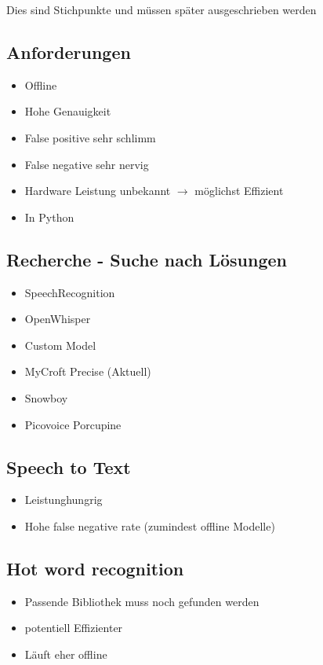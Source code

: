 \documentclass[../main.tex]{subfiles}
\begin{document}
Dies sind Stichpunkte und müssen später ausgeschrieben werden

\subsection{Anforderungen}

\begin{itemize}
    \item Offline
    \item Hohe Genauigkeit
    \item False positive sehr schlimm
    \item False negative sehr nervig
    \item Hardware Leistung unbekannt $\to$ möglichst Effizient
    \item In Python
\end{itemize}

\subsection{Recherche - Suche nach Lösungen}

\begin{itemize}
    \item SpeechRecognition
    \item OpenWhisper
    \item Custom Model
    \item MyCroft Precise (Aktuell)
    \item Snowboy
    \item Picovoice Porcupine
\end{itemize}

\subsection{Speech to Text}

\begin{itemize}
    \item Leistunghungrig
    \item Hohe false negative rate (zumindest offline Modelle)
\end{itemize}

\subsection{Hot word recognition}

\begin{itemize}
    \item Passende Bibliothek muss noch gefunden werden
    \item potentiell Effizienter
    \item Läuft eher offline
\end{itemize}
\end{document}
